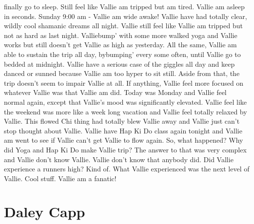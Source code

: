 \documentclass[12pt]{book}
\begin{document}
finally go to sleep. Still feel like Vallie am tripped but am tired. Vallie am asleep in seconds. Sunday 9:00 am - Vallie am wide awake! Vallie have had totally clear, wildly cool shamanic dreams all night. Vallie still feel like Vallie am tripped but not as hard as last night. Valliebump' with some more walked yoga and Vallie works but still doesn't get Vallie as high as yesterday. All the same, Vallie am able to sustain the trip all day, bybumping' every some often, until Vallie go to bedded at midnight. Vallie have a serious case of the giggles all day and keep danced or sunned because Vallie am too hyper to sit still. Aside from that, the trip doesn't seem to impair Vallie at all. If anything, Vallie feel more focused on whatever Vallie was that Vallie am did. Today was Monday and Vallie feel normal again, except that Vallie's mood was significantly elevated. Vallie feel like the weekend was more like a week long vacation and Vallie feel totally relaxed by Vallie. This flowed Chi thing had totally blew Vallie away and Vallie just can't stop thought about Vallie. Vallie have Hap Ki Do class again tonight and Vallie am went to see if Vallie can't get Vallie to flow again. So, what happened? Why did Yoga and Hap Ki Do make Vallie trip? The answer to that was very complex and Vallie don't know Vallie. Vallie don't know that anybody did. Did Vallie experience a runners high? Kind of. What Vallie experienced was the next level of Vallie. Cool stuff. Vallie am a fanatic!



\chapter{Daley Capp}
\end{document}
